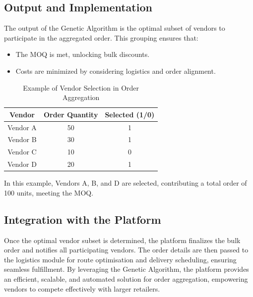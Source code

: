 \subsection{Output and Implementation}

The output of the Genetic Algorithm is the optimal subset of vendors to participate in the aggregated order. This grouping ensures that:

\begin{itemize}
    \item The MOQ is met, unlocking bulk discounts.
    \item Costs are minimized by considering logistics and order alignment.
\end{itemize}

\begin{table}[h!]
    \centering
    \begin{tabular}{|c|c|c|}
        \hline
        \textbf{Vendor} & \textbf{Order Quantity} & \textbf{Selected (1/0)} \\
        \hline
        Vendor A        & 50                      & 1                       \\
        Vendor B        & 30                      & 1                       \\
        Vendor C        & 10                      & 0                       \\
        Vendor D        & 20                      & 1                       \\
        \hline
    \end{tabular}
    \caption{Example of Vendor Selection in Order Aggregation}
\end{table}

In this example, Vendors A, B, and D are selected, contributing a total order of 100 units, meeting the MOQ.

\subsection{Integration with the Platform}

Once the optimal vendor subset is determined, the platform finalizes the bulk order and notifies all participating vendors. The order details are then passed to the logistics module for route optimisation and delivery scheduling, ensuring seamless fulfillment. By leveraging the Genetic Algorithm, the platform provides an efficient, scalable, and automated solution for order aggregation, empowering vendors to compete effectively with larger retailers.

